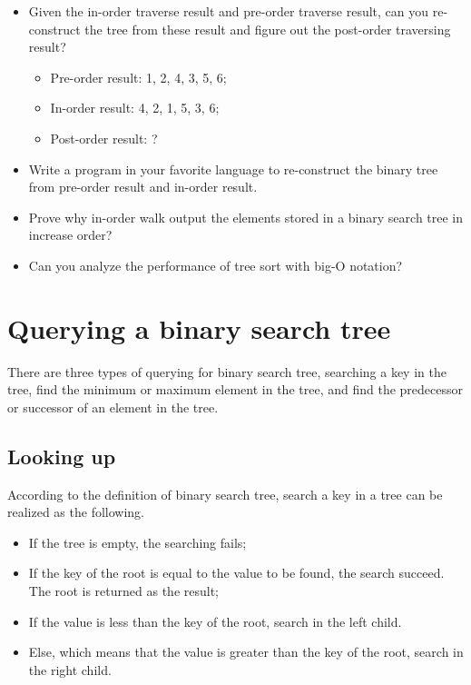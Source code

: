 \documentclass{article}
\begin{document}
\begin{Exercise}

\begin{itemize}
\item Given the in-order traverse result and pre-order traverse result,
can you re-construct the tree from these result and figure out the
post-order traversing result?

\begin{itemize}
\item Pre-order result: 1, 2, 4, 3, 5, 6;
\item In-order result: 4, 2, 1, 5, 3, 6;
\item Post-order result: ?
\end{itemize}

\item Write a program in your favorite language to re-construct
the binary tree from pre-order result and in-order result.

\item Prove why in-order walk output the elements stored in a binary
search tree in increase order?

\item Can you analyze the performance of tree sort with big-O notation?
\end{itemize}
\end{Exercise}

\section{Querying a binary search tree}

There are three types of querying for binary search tree, searching
a key in the tree, find the minimum or maximum element in the tree,
and find the predecessor or successor of an element in the tree.

\subsection{Looking up}
According to the definition of binary search tree, search
a key in a tree can be realized as the following.

\begin{itemize}
\item If the tree is empty, the searching fails;
\item If the key of the root is equal to the value to be found, the
search succeed. The root is returned as the result;
\item If the value is less than the key of the root, search in the left
child.
\item Else, which means that the value is greater than the key of the
root, search in the right child.
\end{itemize}
\end{document}
